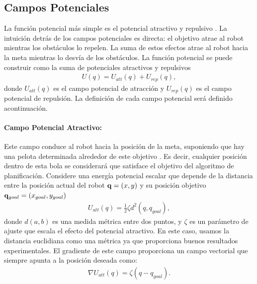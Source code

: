 \subsection{Campos Potenciales}
\label{sec:Campos Potenciales}
La función potencial más simple es el potencial atractivo y repulsivo 
\cite{koren1991potential}. La intuición detrás de los campos potenciales es 
directa: el objetivo atrae al robot mientras los obstáculos lo repelen. La suma 
de estos efectos atrae al robot hacia la meta mientras lo desvía de los 
obstáculos. La función potencial se puede construir como la suma de potenciales 
atractivos y repulsivos
\begin{align}
\label{eqn:potetialField}
U(q) = U_{att}(q) + U_{rep}(q),
\end{align}
donde $U_{att}(q)$ es el campo potencial de atracción y $U_{rep}(q)$ es el campo
potencial de repulsión. La definición de cada campo potencial será definido 
acontinuación.

\paragraph{Campo Potencial Atractivo:}
Este campo conduce al robot hacia la posición de la meta, suponiendo que hay una 
pelota determinada alrededor de este objetivo \cite{koren1991potential}. Es 
decir, cualquier posición dentro de esta bola se considerará que satisface el objetivo 
del algoritmo de planificación. Considere una energía potencial escalar que depende 
de la distancia entre la posición actual del robot $\mathbf q=(x,y)$ y su posición objetivo 
$\mathbf q_{goal} = (x_{goal}, y_{goal})$
\begin{align}
\label{eqn:pot_attr}
U_{att}(q) = \frac{1}{2}\zeta d^{2} (q,q_{goal}),
\end{align}
donde $d(a,b)$ es una medida métrica entre dos puntos, y $\zeta$ es un 
parámetro de ajuste que escala el efecto del potencial atractivo. En este 
caso, usamos la distancia euclidiana como una métrica ya que proporciona 
buenos resultados experimentales. El gradiente de este campo proporciona un 
campo vectorial que siempre apunta a la posición deseada como:
\begin{align}
\label{eqn:gradient_att}
\nabla U_{att}(q)=\zeta(q-q_{goal}).
\end{align}

